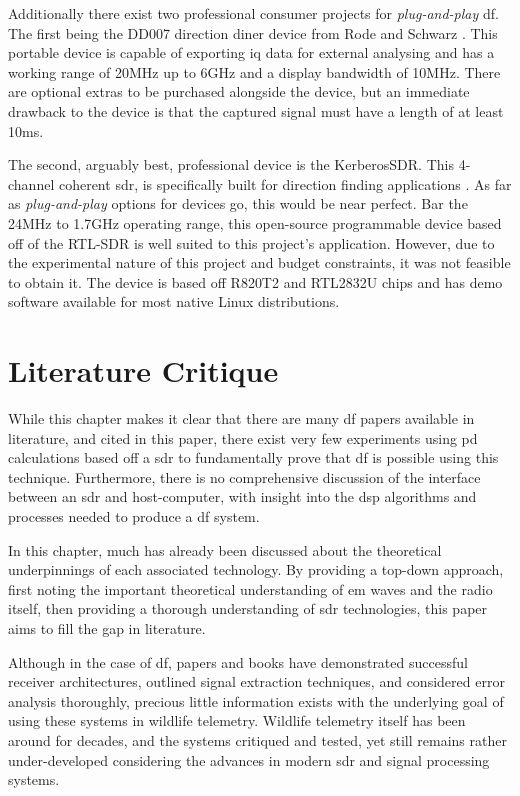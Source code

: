 \documentclass[class=report,11pt,crop=false]{standalone}
\begin{document}
Additionally there exist two professional consumer projects for \emph{plug-and-play} \gls{df}.
The first being the DD007 direction diner device from Rode and Schwarz \cite{DD007}. This portable device is capable of exporting \gls{iq} data for external analysing and has a working range of 20MHz up to 6GHz and a display bandwidth of 10MHz. There are optional extras to be purchased alongside the device, but an immediate drawback to the device is that the captured signal must have a length of at least 10\si{m}s.

The second, arguably best, professional device is the KerberosSDR. This 4-channel coherent \gls{sdr}, is specifically built for direction finding applications \cite{kerberos}. As far as \emph{plug-and-play} options for devices go, this would be near perfect. Bar the 24MHz to 1.7GHz operating range, this open-source programmable device based off of the RTL-SDR is well suited to this project's application. However, due to the experimental nature of this project and budget constraints, it was not feasible to obtain it. The device is based off R820T2 and RTL2832U chips and has demo software available for most native Linux distributions. 


\section{Literature Critique}
While this chapter makes it clear that there are many \gls{df} papers available in literature, and cited in this paper, there exist very few experiments using \gls{pd} calculations based off a \gls{sdr} to fundamentally prove that \gls{df} is possible using this technique. Furthermore, there is no comprehensive discussion of the interface between an \gls{sdr} and host-computer, with insight into the \gls{dsp} algorithms and processes needed to produce a \gls{df} system. 

In this chapter, much has already been discussed about the theoretical underpinnings of each associated technology. By providing a top-down approach, first noting the important theoretical understanding of \gls{em} waves and the radio itself, then providing a thorough understanding of \gls{sdr} technologies, this paper aims to fill the gap in literature.

Although in the case of \gls{df}, papers and books have demonstrated successful receiver architectures, outlined signal extraction techniques, and considered error analysis thoroughly, precious little information exists with the underlying goal of using these systems in wildlife telemetry. Wildlife telemetry itself has been around for decades, and the systems critiqued and tested, yet still remains rather under-developed considering the advances in modern \gls{sdr} and signal processing systems.



\ifstandalone

\printnoidxglossary[type=\acronymtype,nonumberlist]
\fi
\end{document}
